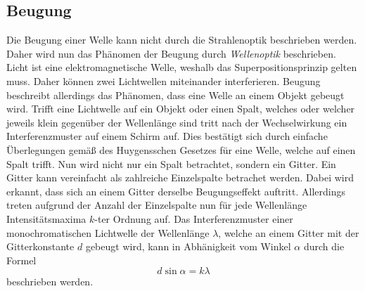 \subsection{Beugung}
\label{subsec:Beugung}
Die Beugung einer Welle kann nicht durch die Strahlenoptik beschrieben werden. Daher wird nun das Phänomen der Beugung durch \textit{Wellenoptik} beschrieben. Licht ist eine
elektromagnetische Welle, weshalb das Superpositionsprinzip gelten muss. Daher können zwei Lichtwellen miteinander interferieren. Beugung beschreibt allerdings das Phänomen,
dass eine Welle an einem Objekt gebeugt wird. Trifft eine Lichtwelle auf ein Objekt oder einen Spalt, welches oder welcher jeweils klein gegenüber der Wellenlänge sind tritt
nach der Wechselwirkung ein Interferenzmuster auf einem Schirm auf. Dies bestätigt sich durch einfache Überlegungen gemäß des Huygensschen Gesetzes für eine Welle, welche auf 
einen Spalt trifft. Nun wird nicht nur ein Spalt betrachtet, sondern ein Gitter. Ein Gitter kann vereinfacht als zahlreiche Einzelspalte betrachet werden. Dabei wird erkannt, 
dass sich an einem Gitter derselbe Beugungseffekt auftritt. Allerdings treten aufgrund der Anzahl der Einzelspalte nun für jede Wellenlänge Intensitätsmaxima $k$-ter Ordnung auf.
Das Interferenzmuster einer monochromatischen Lichtwelle der Wellenlänge $\lambda$, welche an einem Gitter mit der Gitterkonstante $d$ gebeugt wird, kann in Abhänigkeit vom 
Winkel $\alpha$ durch die Formel
\begin{equation}
  \label{eqn:Beugung}
  d\sin\alpha = k\lambda
\end{equation} 
beschrieben werden.